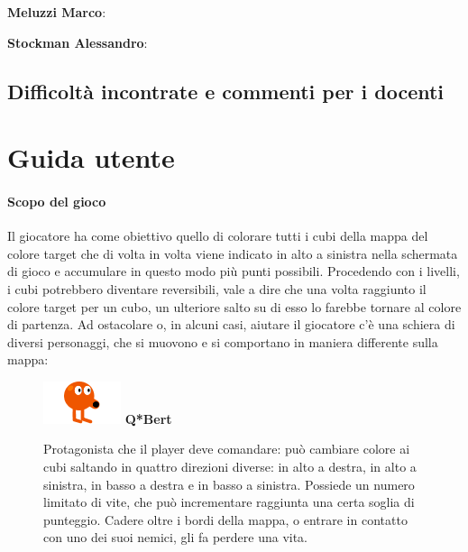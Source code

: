 \documentclass[a4paper,12pt, hidelinks]{report}
\begin{document}
	\item \textbf{Meluzzi Marco}:

	\item \textbf{Stockman Alessandro}:

\section{Difficoltà incontrate e commenti per i docenti}


\appendix
\chapter{Guida utente}

\subsubsection{Scopo del gioco}

Il giocatore ha come obiettivo quello di colorare tutti i cubi della mappa del colore target che di volta in volta viene indicato in alto a sinistra nella schermata di gioco e accumulare in questo modo più punti possibili. Procedendo con i livelli, i cubi potrebbero diventare reversibili, vale a dire che una volta raggiunto il colore target per un cubo, un ulteriore salto su di esso lo farebbe tornare al colore di partenza. Ad ostacolare o, in alcuni casi, aiutare il giocatore c'è una schiera di diversi personaggi, che si muovono e si comportano in maniera differente sulla mappa:


\begin{figure}[H]
		\item
		\includegraphics[width=0.15\linewidth]{img/Qbert}
		\label{img:Q*Bert}
		\textbf{Q*Bert}

		Protagonista che il player deve comandare: può cambiare colore ai cubi saltando in quattro direzioni diverse: in alto a destra, in alto a sinistra, in basso a destra e in basso a sinistra. Possiede un numero limitato di vite, che può incrementare raggiunta una certa soglia di punteggio. Cadere oltre i bordi della mappa, o entrare in contatto con uno dei suoi nemici, gli fa perdere una vita.

\end{figure}
\end{document}
